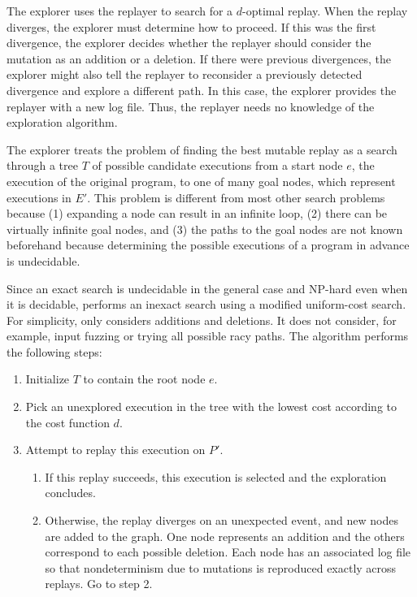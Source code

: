 The explorer uses the replayer to search for a $d$-optimal replay. When the
replay diverges, the explorer must determine how to proceed.
If this was the first divergence, the
explorer decides whether the replayer should consider the mutation as
an addition or a deletion. If there were previous divergences, the
explorer might also tell the replayer to reconsider a previously
detected divergence and explore a different path. In this case, the
explorer provides the replayer with a new log file.  Thus, the 
replayer needs no knowledge of the exploration algorithm.

The explorer treats the problem of finding the best mutable replay as
a search through a tree $T$ of possible candidate executions from a
start node $e$, the execution of the original program, to one of
many goal nodes, which represent executions in $E'$.
This problem is different from most other search problems because
(1) expanding a node can result in an infinite loop,
(2) there can be virtually infinite goal nodes, and
(3) the paths to the
goal nodes are not known beforehand because determining the possible
executions of a program in advance is undecidable.

Since an exact search is undecidable in the general case and NP-hard
even when it is decidable, {\dora} performs an inexact search using
a modified uniform-cost search.  For simplicity, {\dora} only
considers additions and deletions.  It does not consider, for example,
input fuzzing or trying all possible racy paths. The algorithm
performs the following steps: 

\begin{enumerate}
  \item{Initialize $T$ to contain the root node $e$.}
  \item{Pick an unexplored execution in the tree with the lowest cost according
	to the cost function $d$.}
  \item{Attempt to replay this execution on $P'$.}
  \begin{enumerate}
    \item{If this replay succeeds, this execution is selected and the exploration
	concludes.}
    \item{Otherwise, the replay diverges on an unexpected event, and new
	nodes are added to the graph. One node represents an addition
        and the others correspond to each possible deletion.
        Each node has an associated log
        file so that nondeterminism due to mutations is reproduced
        exactly across replays. Go to step 2.}
  \end{enumerate}
\end{enumerate}


